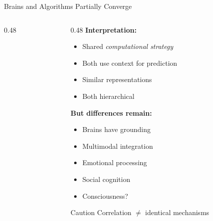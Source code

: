 \documentclass[aspectratio=169]{beamer}
\begin{document}
\begin{frame}{Brains and Algorithms Partially Converge 🤝}
\begin{columns}[T]
\begin{column}{0.48\textwidth}
\begin{center}
\end{center}
\end{column}

\begin{column}{0.48\textwidth}
\textbf{Interpretation:}
\begin{itemize}
    \item Shared \textit{computational strategy}
    \item Both use context for prediction
    \item Similar representations
    \item Both hierarchical
\end{itemize}

\vspace{0.5em}

\textbf{But differences remain:}
\begin{itemize}
    \item Brains have grounding
    \item Multimodal integration
    \item Emotional processing
    \item Social cognition
    \item Consciousness?
\end{itemize}

\vspace{0.3em}

\begin{alertblock}{Caution}
Correlation $\neq$ identical mechanisms
\end{alertblock}
\end{column}
\end{columns}
\end{frame}
\end{document}
